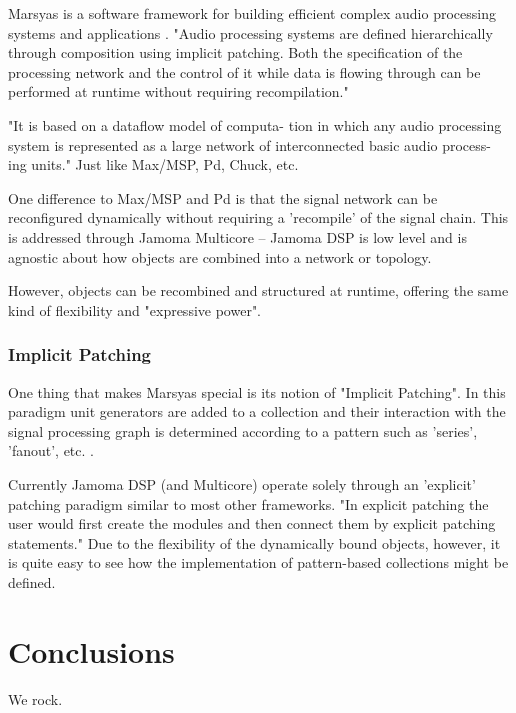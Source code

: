 \documentclass[twoside,a4paper]{article}
\begin{document}
Marsyas is a software framework for building efficient complex audio processing systems and applications \cite{Tzanetakis:2008}. "Audio processing systems are defined hierarchically through composition using implicit patching. Both the specification of the processing network and the control of it while data is flowing through can be performed at runtime without requiring recompilation."

"It is based on a dataflow model of computa- tion in which any audio processing system is represented as a large network of interconnected basic audio process- ing units."  Just like Max/MSP, Pd, Chuck, etc.

One difference to Max/MSP and Pd is that the signal network can be reconfigured dynamically without requiring a 'recompile' of the signal chain.  This is addressed through Jamoma Multicore -- Jamoma DSP is low level and is agnostic about how objects are combined into a network or topology.

However, objects can be recombined and structured at runtime, offering the same kind of flexibility and "expressive power".

\subsubsection{Implicit Patching}

One thing that makes Marsyas special is its notion of "Implicit Patching".  In this paradigm unit generators are added to a collection and their interaction with the signal processing graph is determined according to a pattern such as 'series', 'fanout', etc. \cite{Bray:2005}.

Currently Jamoma DSP (and Multicore) operate solely through an 'explicit' patching paradigm similar to most other frameworks.  "In explicit patching the user would first create the modules and then connect them by explicit patching statements."  Due to the flexibility of the dynamically bound objects, however, it is quite easy to see how the implementation of pattern-based collections might be defined.



\section{Conclusions}
We rock.
\end{document}
